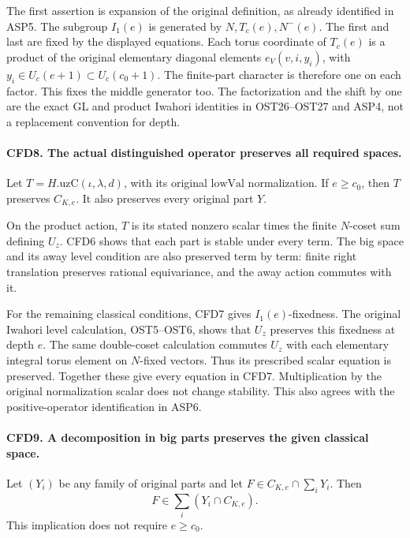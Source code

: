 The first assertion is expansion of the original definition, as already
identified in ASP5.  The subgroup \(I_1(e)\) is generated by
\(N,T_c(e),N^-(e)\).  The first and last are fixed by the displayed
equations.  Each torus coordinate of \(T_c(e)\) is a product of the
original elementary diagonal elements \(e_V(v,i,y_i)\), with
\(y_i\in U_c(e+1)\subset U_c(c_0+1)\).  The finite-part character
is therefore one on each factor.  This fixes the middle generator too.
The factorization and the shift by one are the exact GL and product
Iwahori identities in OST26--OST27 and ASP4, not a replacement convention
for depth.

\paragraph{CFD8. The actual distinguished operator preserves all required spaces.}
\label{claim:CFD8}
Let \(T=H.\mathrm{uzC}(\iota,\lambda,d)\), with its original
\(\mathrm{lowVal}\) normalization.  If \(e\ge c_0\), then \(T\)
preserves \(C_{K,e}\).  It also preserves every original part \(Y\).

On the product action, \(T\) is its stated nonzero scalar times the
finite \(N\)-coset sum defining \(U_z\).  CFD6 shows that each part is
stable under every term.  The big space and its away level condition are
also preserved term by term: finite right translation preserves rational
equivariance, and the away action commutes with it.

For the remaining classical conditions, CFD7 gives \(I_1(e)\)-fixedness.
The original Iwahori level calculation, OST5--OST6, shows that \(U_z\)
preserves this fixedness at depth \(e\).  The same double-coset calculation
commutes \(U_z\) with each elementary integral torus element on
\(N\)-fixed vectors.  Thus its prescribed scalar equation is preserved.
Together these give every equation in CFD7.  Multiplication by the
original normalization scalar does not change stability.  This also
agrees with the positive-operator identification in ASP6.

\paragraph{CFD9. A decomposition in big parts preserves the given classical space.}
\label{claim:CFD9}
Let \((Y_i)\) be any family of original parts and let
\(F\in C_{K,e}\cap\sum_iY_i\).  Then
\[
                         F\in\sum_i(Y_i\cap C_{K,e}).
\]
This implication does not require \(e\ge c_0\).

